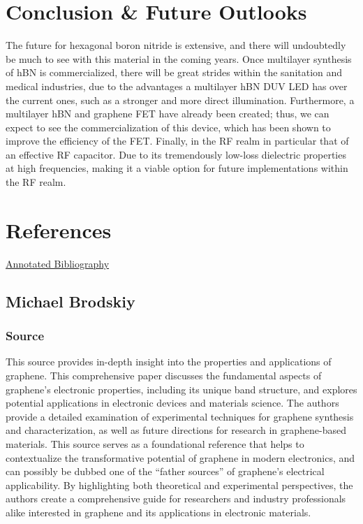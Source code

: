 \documentclass[conference]{IEEEtran}
\begin{document}
\section{Conclusion \& Future Outlooks}

The future for hexagonal boron nitride is extensive, and there will undoubtedly be much to see with this material in the coming years. Once multilayer synthesis of hBN is commercialized, there will be great strides within the sanitation and medical industries, due to the advantages a multilayer hBN DUV LED has over the current ones, such as a stronger and more direct illumination. Furthermore, a multilayer hBN and graphene FET have already been created; thus, we can expect to see the commercialization of this device, which has been shown to improve the efficiency of the FET. Finally, in the RF realm in particular that of an effective RF capacitor. Due to its tremendously low-loss dielectric properties at high frequencies, making it a viable option for future implementations within the RF realm.

\section*{References}

\begin{center}
  \underline{Annotated Bibliography}
\end{center}

\subsection{Michael Brodskiy}

\subsubsection{Source \cite{mb4}}

This source provides in-depth insight into the properties and applications of graphene. This comprehensive paper discusses the fundamental aspects of graphene's electronic properties, including its unique band structure, and explores potential applications in electronic devices and materials science. The authors provide a detailed examination of experimental techniques for graphene synthesis and characterization, as well as future directions for research in graphene-based materials. This source serves as a foundational reference that helps to contextualize the transformative potential of graphene in modern electronics, and can possibly be dubbed one of the ``father sources'' of graphene's electrical applicability. By highlighting both theoretical and experimental perspectives, the authors create a comprehensive guide for researchers and industry professionals alike interested in graphene and its applications in electronic materials.
\end{document}
